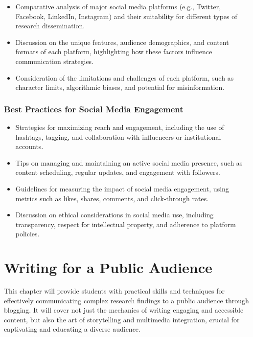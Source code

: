 \documentclass[
]{book}
\begin{document}
\begin{itemize}
\item
  Comparative analysis of major social media platforms (e.g., Twitter, Facebook, LinkedIn, Instagram) and their suitability for different types of research dissemination.
\item
  Discussion on the unique features, audience demographics, and content formats of each platform, highlighting how these factors influence communication strategies.
\item
  Consideration of the limitations and challenges of each platform, such as character limits, algorithmic biases, and potential for misinformation.
\end{itemize}

\hypertarget{best-practices-for-social-media-engagement}{%
\subsection*{Best Practices for Social Media Engagement}\label{best-practices-for-social-media-engagement}}

\begin{itemize}
\item
  Strategies for maximizing reach and engagement, including the use of hashtags, tagging, and collaboration with influencers or institutional accounts.
\item
  Tips on managing and maintaining an active social media presence, such as content scheduling, regular updates, and engagement with followers.
\item
  Guidelines for measuring the impact of social media engagement, using metrics such as likes, shares, comments, and click-through rates.
\item
  Discussion on ethical considerations in social media use, including transparency, respect for intellectual property, and adherence to platform policies.
\end{itemize}

\hypertarget{writing-for-a-public-audience}{%
\chapter*{Writing for a Public Audience}\label{writing-for-a-public-audience}}

This chapter will provide students with practical skills and techniques for effectively communicating complex research findings to a public audience through blogging. It will cover not just the mechanics of writing engaging and accessible content, but also the art of storytelling and multimedia integration, crucial for captivating and educating a diverse audience.
\end{document}
